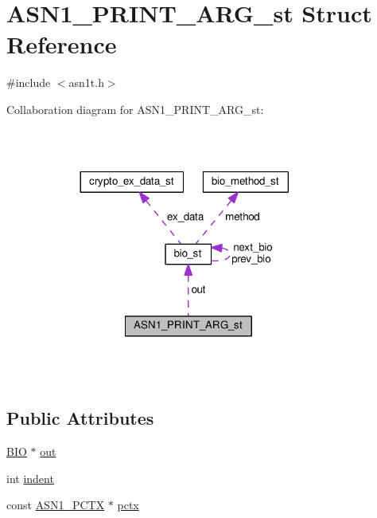 \hypertarget{struct_a_s_n1___p_r_i_n_t___a_r_g__st}{}\section{A\+S\+N1\+\_\+\+P\+R\+I\+N\+T\+\_\+\+A\+R\+G\+\_\+st Struct Reference}
\label{struct_a_s_n1___p_r_i_n_t___a_r_g__st}


{\ttfamily \#include $<$asn1t.\+h$>$}



Collaboration diagram for A\+S\+N1\+\_\+\+P\+R\+I\+N\+T\+\_\+\+A\+R\+G\+\_\+st\+:
\nopagebreak
\begin{figure}[H]
\begin{center}
\leavevmode
\includegraphics[width=276pt]{struct_a_s_n1___p_r_i_n_t___a_r_g__st__coll__graph}
\end{center}
\end{figure}
\subsection*{Public Attributes}
\begin{DoxyCompactItemize}
\item 
\hyperlink{bio_8h_af3fabae1c9af50b9312cdff41e11d1dd}{B\+IO} $\ast$ \hyperlink{struct_a_s_n1___p_r_i_n_t___a_r_g__st_a238eca48eea38372c40de60fbdc4d4ee}{out}
\item 
int \hyperlink{struct_a_s_n1___p_r_i_n_t___a_r_g__st_a62f3360ea4704ea92e62e0a4c28d238f}{indent}
\item 
const \hyperlink{ossl__typ_8h_a88063a1a0d89cda63e8a53c271225bd3}{A\+S\+N1\+\_\+\+P\+C\+TX} $\ast$ \hyperlink{struct_a_s_n1___p_r_i_n_t___a_r_g__st_a6ef7daafd5db8eeb310b27206b3b243a}{pctx}
\end{DoxyCompactItemize}


